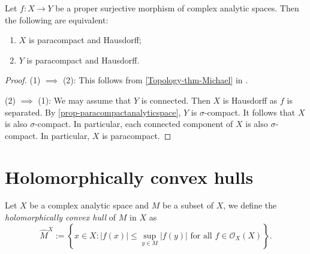 \begin{lemma}\label{lma-paracompactpropersurjimage}
    Let $f:X\rightarrow Y$ be a proper surjective morphism of complex analytic spaces. Then the following are equivalent:
    \begin{enumerate}
        \item $X$ is paracompact and Hausdorff;
        \item $Y$ is paracompact and Hausdorff.
    \end{enumerate}
\end{lemma}
\begin{proof}
    (1) $\implies$ (2): This follows from \cref{Topology-thm-Michael} in .

    (2) $\implies$ (1): We may assume that $Y$ is connected. Then $X$ is Hausdorff as $f$ is separated. By \cref{prop-paracompactanalyticspace}, $Y$ is $\sigma$-compact. It follows that $X$ is also $\sigma$-compact. In particular, each connected component of $X$ is also $\sigma$-compact. In particular, $X$ is paracompact.
\end{proof}


\section{Holomorphically convex hulls}

\begin{definition}
    Let $X$ be a complex analytic space and $M$ be a subset of $X$, we define the \emph{holomorphically convex hull} of $M$ in $X$ as
    \[
        \hat{M}^X:=  \left\{ x\in X: |f(x)|\leq \sup_{y\in M}|f(y)|\text{ for all }f\in \mathcal{O}_X(X) \right\}.  
    \]
\end{definition}

